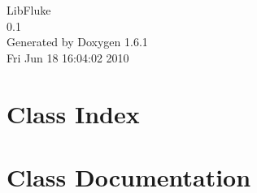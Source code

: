 \documentclass[a4paper]{book}
\begin{document}
\hypersetup{pageanchor=false}
\begin{titlepage}
\vspace*{7cm}
\begin{center}
{\Large LibFluke \\[1ex]\large 0.1 }\\
\vspace*{1cm}
{\large Generated by Doxygen 1.6.1}\\
\vspace*{0.5cm}
{\small Fri Jun 18 16:04:02 2010}\\
\end{center}
\end{titlepage}
\clearemptydoublepage
{}
\tableofcontents
\clearemptydoublepage
{}
\hypersetup{pageanchor=true}
\chapter{Class Index}

\chapter{Class Documentation}













\printindex
\end{document}
